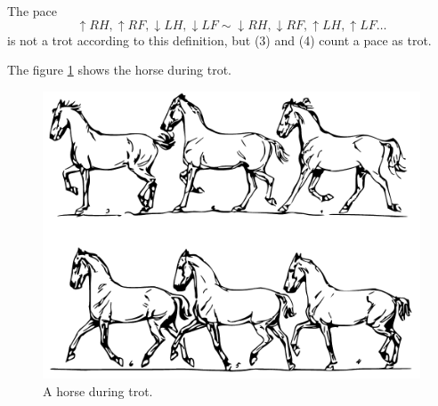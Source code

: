 \begin{remark}
    The pace $$\uparrow RH, \uparrow RF, \downarrow LH, \downarrow LF \sim \downarrow RH, \downarrow RF, \uparrow LH, \uparrow LF \dots$$ is not a trot according to this definition, but (3) and (4) count a pace as trot.
\end{remark}

The figure \ref{fig:trot} shows the horse during trot.

\begin{figure}
	\centering
	\caption{A horse during trot. \cite{Duruttya2005}}
	\label{fig:trot}
	\includegraphics[width=\linewidth]{img/klus.pdf}
\end{figure}

